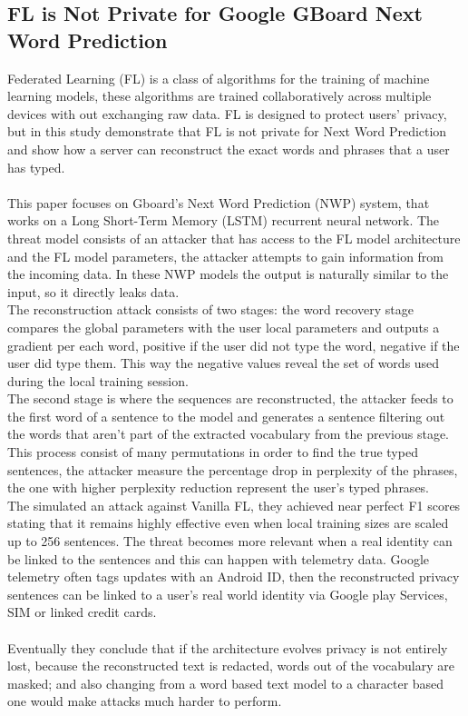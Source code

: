 \subsection{FL is Not Private for Google GBoard Next Word Prediction}
Federated Learning (FL) is a class of algorithms for the training of machine learning models, these algorithms are trained collaboratively across multiple devices with out exchanging raw data. FL is designed to protect users' privacy, but in this study \cite{10.1007/978-3-031-51482-1_6} demonstrate that FL is not private for Next Word Prediction and show how a server can reconstruct the exact words and phrases that a user has typed. 
\\\\ This paper focuses on Gboard's Next Word Prediction (NWP) system, that works on a Long Short-Term Memory (LSTM) recurrent neural network. The threat model consists of an attacker that has access to the FL model architecture and the FL model parameters, the attacker attempts to gain information from the incoming data. In these NWP models the output is naturally similar to the input, so it directly leaks data. 
\\The reconstruction attack consists of two stages: the word recovery stage compares the global parameters with the user local parameters and outputs a gradient per each word, positive if the user did not type the word, negative if the user did type them. This way the negative values reveal the set of words used during the local training session. 
\\The second stage is where the sequences are reconstructed, the attacker feeds to the first word of a sentence to the model and generates a sentence filtering out the words that aren't part of the extracted vocabulary from the previous stage. This process consist of many permutations in order to find the true typed sentences, the attacker measure the percentage drop in perplexity of the phrases, the one with higher perplexity reduction represent the user's typed phrases. 
\\The simulated an attack against Vanilla FL, they achieved near perfect F1 scores stating that it remains highly effective even when local training sizes are scaled up to 256 sentences. The threat becomes more relevant when a real identity can be linked to the sentences and this can happen with telemetry data. Google telemetry often tags updates with an Android ID, then the reconstructed privacy sentences can be linked to a user's real world identity via Google play Services, SIM or linked credit cards. 
\\\\Eventually they conclude that if the architecture evolves privacy is not entirely lost, because the reconstructed text is redacted, words out of the vocabulary are masked; and also changing from a word based text model to a character based one would make attacks much harder to perform. 

